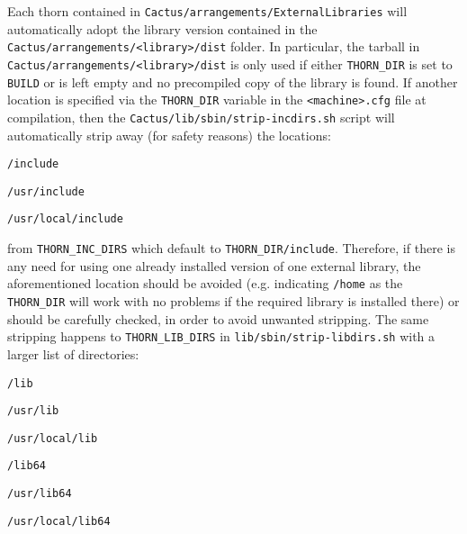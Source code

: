 Each thorn contained in \texttt{Cactus/arrangements/ExternalLibraries} will automatically adopt the library version contained in the \texttt{Cactus/arrangements/<library>/dist} folder. In particular, the tarball in \texttt{Cactus/arrangements/<library>/dist} is only used if either \texttt{THORN\_DIR} is set to \texttt{BUILD} or is left empty and no precompiled copy of the library is found. If another location is specified via the \texttt{THORN\_DIR} variable in the \texttt{<machine>.cfg} file at compilation, then the \texttt{Cactus/lib/sbin/strip-incdirs.sh} script will automatically strip away (for safety reasons) the locations:
\begin{Lentry}
\item [\texttt{/include}]
\item [\texttt{/usr/include}]
\item [\texttt{/usr/local/include}]
\end{Lentry}
from \texttt{THORN\_INC\_DIRS} which default to \texttt{THORN\_DIR/include}. Therefore, if there is any need for using one already installed version of one external library, the aforementioned location should be avoided (e.g. indicating \texttt{/home} as the \texttt{THORN\_DIR} will work with no problems if the required library is installed there) or should be carefully checked, in order to avoid unwanted stripping. The same stripping happens to \texttt{THORN\_LIB\_DIRS} in \texttt{lib/sbin/strip-libdirs.sh} with a larger list of directories:
\begin{Lentry}
\item [\texttt{/lib}]
\item [\texttt{/usr/lib}]
\item [\texttt{/usr/local/lib}]
\item [\texttt{/lib64}]
\item [\texttt{/usr/lib64}]
\item [\texttt{/usr/local/lib64}] 
\end{Lentry}


% 



